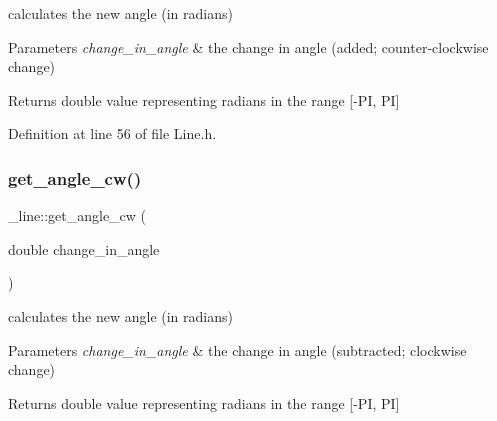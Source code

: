 calculates the new angle (in radians) 


\begin{DoxyParams}{Parameters}
{\em change\+\_\+in\+\_\+angle} & the change in angle (added; counter-\/clockwise change) \\
\hline
\end{DoxyParams}
\begin{DoxyReturn}{Returns}
double value representing radians in the range \mbox{[}-\/PI, PI\mbox{]} 
\end{DoxyReturn}


Definition at line 56 of file Line.\+h.


\begin{DoxyCode}{0}

\end{DoxyCode}
\mbox{\label{struct__line_a4182e9dc8bedf189355c1e6af67b2fc4}} 
\subsubsection{\texorpdfstring{get\_angle\_cw()}{get\_angle\_cw()}}
{\footnotesize\ttfamily \+\_\+line\+::get\+\_\+angle\+\_\+cw (\begin{DoxyParamCaption}\item[{double}]{change\+\_\+in\+\_\+angle }\end{DoxyParamCaption})\hspace{0.3cm}{\ttfamily [inline]}}



calculates the new angle (in radians) 


\begin{DoxyParams}{Parameters}
{\em change\+\_\+in\+\_\+angle} & the change in angle (subtracted; clockwise change) \\
\hline
\end{DoxyParams}
\begin{DoxyReturn}{Returns}
double value representing radians in the range \mbox{[}-\/PI, PI\mbox{]} 
\end{DoxyReturn}


